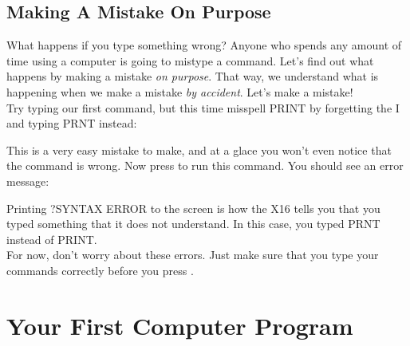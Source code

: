 \section{Making A Mistake On Purpose}

What happens if you type something wrong?  Anyone who spends any amount of time
using a computer is going to mistype a command.  Let's find out what happens by
making a mistake \emph{on purpose}.  That way, we understand what is happening
when we make a mistake \emph{by accident}.  Let's make a mistake!\\

Try typing our first command, but this time misspell {\ttfamily PRINT} by
forgetting the {\ttfamily I} and typing {\ttfamily PRNT} instead:


This is a very easy mistake to make, and at a glace you won't even notice that
the command is wrong.  Now press  to run this command.  You
should see an error message:


Printing {\ttfamily ?SYNTAX ERROR} to the screen is how the X16 tells you that
you typed something that it does not understand.  In this case, you typed
{\ttfamily PRNT} instead of {\ttfamily PRINT}.\\

For now, don't worry about these errors.  Just make sure that you type your
commands correctly before you press .


\chapter{Your First Computer Program}

\@openrighttrue\makeatother
